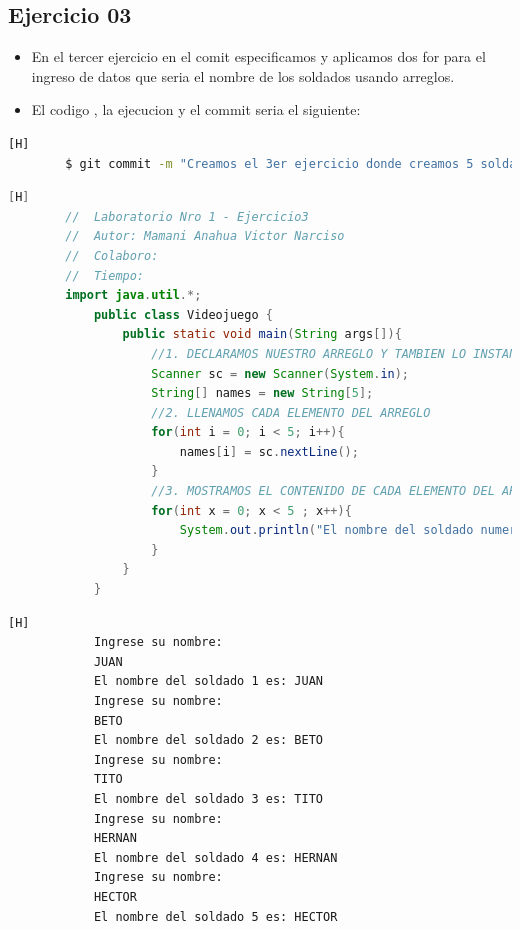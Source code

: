 \documentclass{article}
\begin{document}
	\subsection{Ejercicio 03}
	\begin{itemize}	
		\item En el tercer ejercicio en el comit especificamos y aplicamos dos for para el ingreso de datos que seria el nombre de los soldados usando arreglos.
		\item El codigo , la ejecucion y el commit seria el siguiente:
	\end{itemize}
	\begin{lstlisting}[language=bash,caption={Commit}][H]
		$ git commit -m "Creamos el 3er ejercicio donde creamos 5 soldados y imprimimos sus nombres usando arreglos"
	\end{lstlisting}
	\begin{lstlisting}[language=java,caption={Las lineas de codigo del Ejercicio03 serian}][H]
		//  Laboratorio Nro 1 - Ejercicio3
		//  Autor: Mamani Anahua Victor Narciso
		//  Colaboro:
		//  Tiempo: 
		import java.util.*;
			public class Videojuego {
				public static void main(String args[]){
					//1. DECLARAMOS NUESTRO ARREGLO Y TAMBIEN LO INSTANCIAMOS
					Scanner sc = new Scanner(System.in);
					String[] names = new String[5];
					//2. LLENAMOS CADA ELEMENTO DEL ARREGLO
					for(int i = 0; i < 5; i++){
						names[i] = sc.nextLine();
					}	
					//3. MOSTRAMOS EL CONTENIDO DE CADA ELEMENTO DEL ARREGLO
					for(int x = 0; x < 5 ; x++){
						System.out.println("El nombre del soldado numero " + (x + 1) + " es: " + names[x]);
					}
				}
			}
	\end{lstlisting}
	\begin{lstlisting}[language=bash,caption={La ejecucuion dada:}][H]
			Ingrese su nombre: 
			JUAN
			El nombre del soldado 1 es: JUAN
			Ingrese su nombre: 
			BETO
			El nombre del soldado 2 es: BETO
			Ingrese su nombre: 
			TITO
			El nombre del soldado 3 es: TITO
			Ingrese su nombre: 
			HERNAN
			El nombre del soldado 4 es: HERNAN
			Ingrese su nombre: 
			HECTOR
			El nombre del soldado 5 es: HECTOR
	\end{lstlisting}
\end{document}

